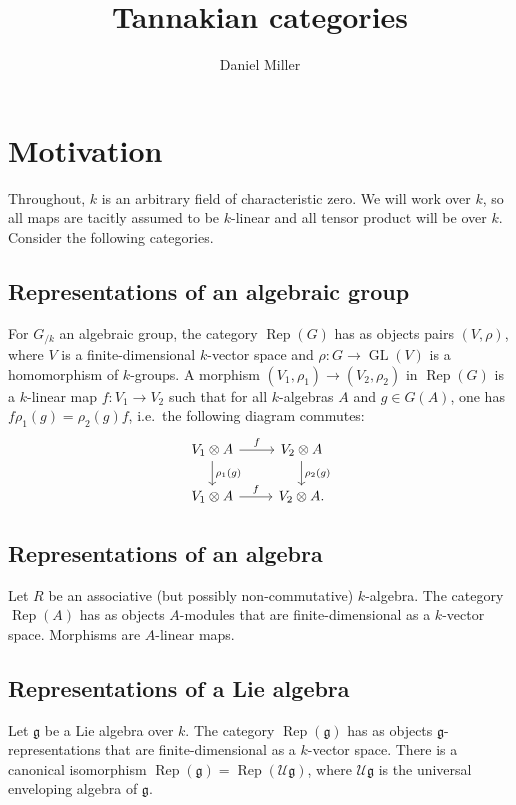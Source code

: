 \documentclass{article}
\title{Tannakian categories}
\author{Daniel Miller}
\DeclareMathOperator{\GL}{GL}
\DeclareMathOperator{\rep}{Rep}
\newcommand{\cU}{\mathcal{U}}
\newcommand{\fg}{\mathfrak{g}}
\begin{document}
\maketitle





\section{Motivation}\label{sec:examples}

Throughout, $k$ is an arbitrary field of characteristic zero. We will work over 
$k$, so all maps are tacitly assumed to be $k$-linear and all tensor product 
will be over $k$. Consider the following categories. 


\subsection{Representations of an algebraic group}\label{sec:rep-gp}

For $G_{/k}$ an algebraic group, the category $\rep(G)$ has as objects pairs 
$(V,\rho)$, where $V$ is a finite-dimensional $k$-vector space and 
$\rho:G\to \GL(V)$ is a homomorphism of $k$-groups. A morphism 
$(V_1,\rho_1)\to (V_2,\rho_2)$ in $\rep(G)$ is a $k$-linear map 
$f:V_1\to V_2$ such that for all $k$-algebras $A$ and $g\in G(A)$, one has 
$f \rho_1(g) = \rho_2(g)  f$, i.e.~the following diagram commutes:
\[
\begin{tikzcd}
  V_1\otimes A \ar[r, "f"] \ar[d, "\rho_1(g)"] 
    & V_2\otimes A \ar[d, "\rho_2(g)"] \\
  V_1\otimes A \ar[r, "f"]
    & V_2\otimes A .
\end{tikzcd}
\]


\subsection{Representations of an algebra}\label{sec:rep-alg}

Let $R$ be an associative (but possibly non-commutative) $k$-algebra. The 
category $\rep(A)$ has as objects $A$-modules that are finite-dimensional as 
a $k$-vector space. Morphisms are $A$-linear maps. 


\subsection{Representations of a Lie algebra}\label{sec:rep-liealg}

Let $\fg$ be a Lie algebra over $k$. The category $\rep(\fg)$ has as objects 
$\fg$-representations that are finite-dimensional as a $k$-vector space. There 
is a canonical isomorphism $\rep(\fg)=\rep(\cU \fg)$, where $\cU \fg$ is the 
universal enveloping algebra of $\fg$. 
\end{document}
